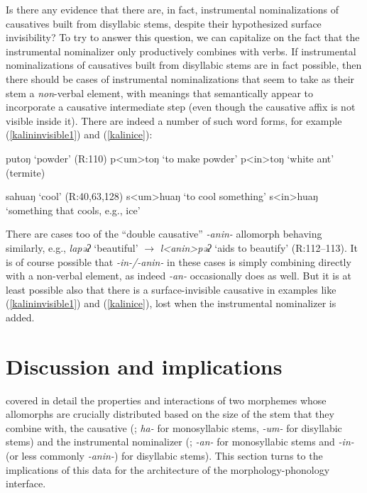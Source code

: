 \documentclass[output=paper]{langscibook}
\begin{document}

Is there any evidence that there are, in fact, instrumental nominalizations of causatives built from disyllabic stems, despite their hypothesized surface invisibility? To try to answer this question, we can capitalize on the fact that the instrumental nominalizer only productively combines with verbs. If instrumental nominalizations of causatives built from disyllabic stems are in fact possible, then there should be cases of instrumental nominalizations that seem to take as their stem a \textit{non}-verbal element, with meanings that semantically appear to incorporate a causative intermediate step (even though the causative affix is not visible inside it). There are indeed a number of such word forms, for example (\ref{kalininvisible1}) and (\ref{kalinice}):

\ea
\ea putoŋ `powder' \hfill (R:110)
\ex p<um>toŋ `to make powder'
\ex p<in>toŋ `white ant' (termite)\label{kalininvisible1}
\z
\z

\ea \ea sahuaŋ `cool' \hfill (R:40,63,128)
\ex s<um>huaŋ `to cool something' 
\ex s<in>huaŋ `something that cools, e.g., ice'\label{kalinice}
\z
\z

\noindent There are cases too of the ``double causative'' \textit{-anin-} allomorph behaving similarly, e.g., \textit{lapəʔ} `beautiful' $\rightarrow$ \textit{l<anin>pəʔ} `aids to beautify' (R:112--113). It is of course possible that \textit{-in-/-anin-} in these cases is simply combining directly with a non-verbal element, as indeed \textit{-an-} occasionally does as well. But it is at least possible also that there is a surface-invisible causative in examples like (\ref{kalininvisible1}) and (\ref{kalinice}), lost when the instrumental nominalizer is added. 

\section{Discussion and implications}\label{sec:kalin:4}

 covered in detail the properties and interactions of two morphemes whose allomorphs are crucially distributed based on the size of the stem that they combine with, the causative (; \textit{ha-} for monosyllabic stems, \textit{-um-} for disyllabic stems) and the instrumental nominalizer (; \textit{-an-} for monosyllabic stems and \textit{-in-} (or less commonly \textit{-anin-}) for disyllabic stems). This section turns to the implications of this data for the architecture of the morphology-phonology interface. 
\end{document}
